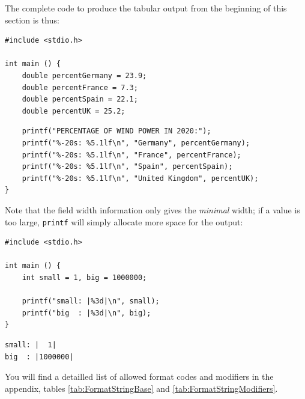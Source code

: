 {{{{The complete code to produce the tabular output from the beginning of this section is thus:
\begin{codebox}[autoalignedOutput.c]
\begin{verbatim}
#include <stdio.h>

int main () {
    double percentGermany = 23.9;
    double percentFrance = 7.3;
    double percentSpain = 22.1;
    double percentUK = 25.2;
\end{verbatim}
\end{codebox}
%
\begin{codebox}[]
\begin{verbatim}
    printf("PERCENTAGE OF WIND POWER IN 2020:");
    printf("%-20s: %5.1lf\n", "Germany", percentGermany);
    printf("%-20s: %5.1lf\n", "France", percentFrance);
    printf("%-20s: %5.1lf\n", "Spain", percentSpain);
    printf("%-20s: %5.1lf\n", "United Kingdom", percentUK);
}
\end{verbatim}
\end{codebox}

Note that the field width information only gives the \emph{minimal} width; if a value is too large, \texttt{printf} will simply allocate more space for the output:
\begin{tcbraster}[raster columns=2,
                  raster equal height,
                  nobeforeafter,
                  raster column skip=0.2cm]
\begin{codebox}[oversizedOutput.c]
\begin{verbatim}
#include <stdio.h>

int main () {
    int small = 1, big = 1000000;

    printf("small: |%3d|\n", small);
    printf("big  : |%3d|\n", big);
}
\end{verbatim}
\end{codebox}
%
\begin{cmdbox}
\begin{verbatim}
small: |  1|
big  : |1000000|
\end{verbatim}
\end{cmdbox}
\end{tcbraster}

You will find a detailled list of allowed format codes and modifiers in the appendix, tables \ref{tab:FormatStringBase} and \ref{tab:FormatStringModifiers}.


}}}}
